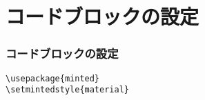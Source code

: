 \section{コードブロックの設定}
\begin{frame}[fragile]
    \frametitle{コードブロックの設定}
    \begin{verbatim}
\usepackage{minted}
\setmintedstyle{material}
    \end{verbatim}
\end{frame}
